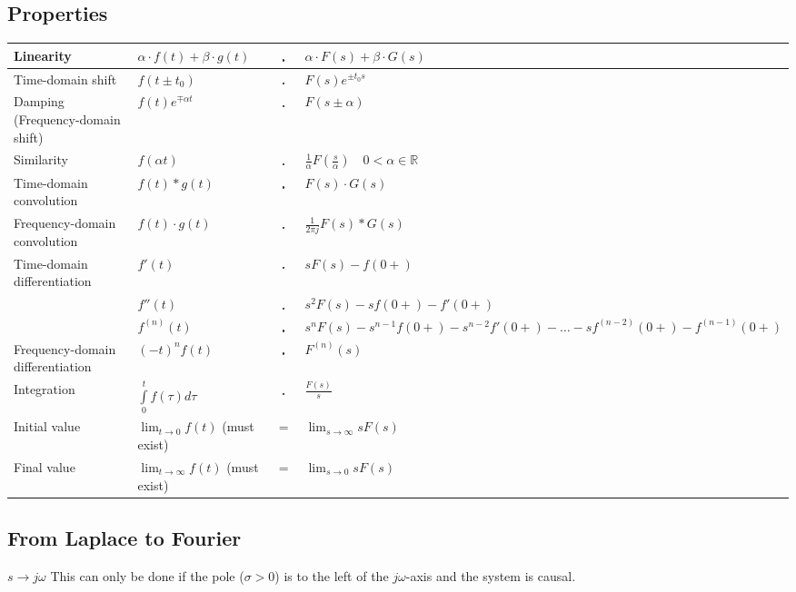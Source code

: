  	\subsection{Properties}
 	    \label{sec:Laplace Umwandulungen}
  		\renewcommand{\arraystretch}{2}
		\begin{tabular}{|l|l c p{5.5cm}|}
        	\hline
        	Linearity &
 			$\alpha\cdot f(t) + \beta\cdot g(t)$ & $\FT$ & $\alpha\cdot F(s) +
 			\beta\cdot G(s)$ \\
 			\hline
 			Time-domain shift &
 			$f(t\pm t_0) $ & $\FT$ & $ F(s)e^{\pm t_0 s}$ \\
 			\hline
 			Damping (Frequency-domain shift) &
 			$f(t)e^{\mp\alpha t}$ & $\FT$ & $F(s\pm\alpha)$ \\
 			\hline
 			Similarity&
 			$f(\alpha t)$ & $\FT$ & $\frac{1}{\alpha}F \left (\frac{s}{\alpha} \right )
 			\quad 0 <\alpha \in\mathbb{R}$ \\
 			\hline
 			Time-domain convolution &
 			$f(t) \ast g(t)$ & $\FT$ &
 			$F(s) \cdot G(s)$\\
 			\hline
 			Frequency-domain convolution &
 			$f(t) \cdot g(t)$ & $\FT$ & $\frac{1}{2 \pi j} F(s) \ast G(s)$ \\
 			\hline
 			Time-domain differentiation &
 			$f'(t)$ & $\FT$ & $sF(s) - f(0+)$ \\
 			&
 			$f''(t)$ & $\FT$ & $s^2 F(s) - sf(0+) - f'(0+)$\\
 			&
 			$f^{(n)}(t)$ & $\FT$ & $s^nF(s) - s^{n-1}f(0+) - s^{n-2} f'(0+) - \ldots
 			-s f^{(n-2)}(0+) - f^{(n-1)}(0+)$ \\
 			\hline
 			Frequency-domain differentiation &
 			$(-t)^n f(t)$ & $\FT$ & $F^{(n)}(s)$ \\
 			\hline
 			Integration &
 			$\int\limits_0^t f(\tau)d\tau$ & $\FT$ & $\frac{F(s)}{s}$ \\
 			\hline
 			Initial value &
 			$\lim_{t\rightarrow 0} f(t)$ (must exist) & $=$ & $\lim_{s\rightarrow
 			\infty} sF(s)$ \\
 			\hline
 			Final value &
 			$\lim_{t\rightarrow \infty} f(t)$ (must exist) & $=$ &
 			$\lim_{s\rightarrow 0} sF(s)$ \\
 			\hline
       	\end{tabular}
		\renewcommand{\arraystretch}{1}


		\subsection{From Laplace to Fourier}
			$s \rightarrow j\omega$ \hspace{0.5cm}
			This can only be done if the pole ($\sigma > 0$) is to the left of
			the $j\omega$-axis and the system is causal.


